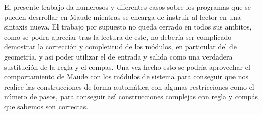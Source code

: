 

El presente trabajo da numerosos y diferentes casos sobre los programas que se pueden desrrollar en Maude mientras se encarga de instruir al lector en una sintaxis nueva. El trabajo por supuesto no queda cerrado en todos sus ambitos, como se podra apreciar tras la lectura de este, no debería ser complicado demostrar la corrección y completitud de los módulos, en particular del de geometría, y asi poder utilizar el de entrada y salida como una verdadera sustitución de la regla y el compas. Una vez hecho esto se podría aprovechar el comportamiento de Maude con los módulos de sistema para conseguir que nos realice las construcciones de forma automática con algunas restricciones como el número de pasos, para conseguir así construcciones complejas con regla y compás que sabemos son correctas.\par
